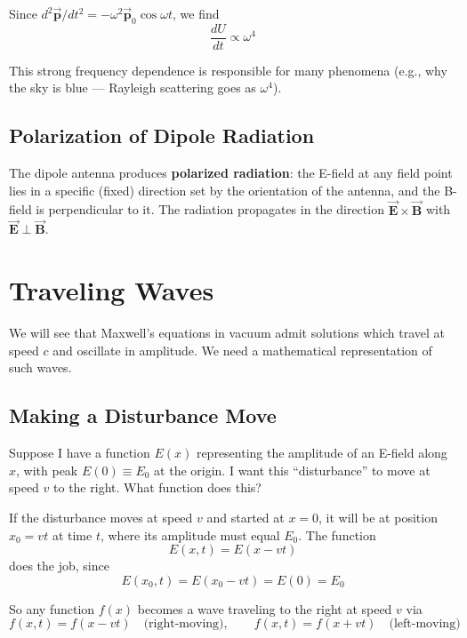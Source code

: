 \documentclass[11pt]{report}
\newcommand{\vbf}[1]{\vec{\mathbf{#1}}}
\begin{document}
Since $d^2\vbf{p}/dt^2 = -\omega^2 \vbf{p}_0 \cos\omega t$, we find
\begin{equation}
\boxed{\frac{dU}{dt} \propto \omega^4}
\end{equation}

This strong frequency dependence is responsible for many phenomena (e.g., why the sky is blue --- Rayleigh scattering goes as $\omega^4$).

\subsection{Polarization of Dipole Radiation}

The dipole antenna produces \textbf{polarized radiation}: the E-field at any field point lies in a specific (fixed) direction set by the orientation of the antenna, and the B-field is perpendicular to it. The radiation propagates in the direction $\vbf{E}\times\vbf{B}$ with $\vbf{E}\perp\vbf{B}$.

\section{Traveling Waves}

We will see that Maxwell's equations in vacuum admit solutions which travel at speed $c$ and oscillate in amplitude. We need a mathematical representation of such waves.

\subsection*{Making a Disturbance Move}

Suppose I have a function $E(x)$ representing the amplitude of an E-field along $\hat{x}$, with peak $E(0) \equiv E_0$ at the origin. I want this ``disturbance'' to move at speed $v$ to the right. What function does this?

If the disturbance moves at speed $v$ and started at $x = 0$, it will be at position $x_0 = vt$ at time $t$, where its amplitude must equal $E_0$. The function
\begin{equation}
E(x,t) = E(x - vt)
\end{equation}
does the job, since
\begin{equation}
E(x_0, t) = E(x_0 - vt) = E(0) = E_0
\end{equation}

So any function $f(x)$ becomes a wave traveling to the right at speed $v$ via
\begin{equation}
\boxed{f(x,t) = f(x - vt) \quad \text{(right-moving)}, \qquad f(x,t) = f(x + vt) \quad \text{(left-moving)}}
\end{equation}
\end{document}
